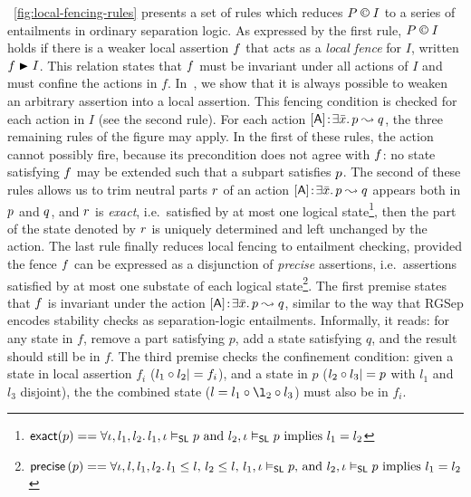 \fig~\ref{fig:local-fencing-rules} presents a set of
rules which reduces  $P \containI I$ to a series of entailments in
ordinary separation logic. As expressed by the first rule,
$P \containI I$ holds if there is a weaker local assertion $\lass{F}$
that acts as a \emph{local fence} for $I$, written 
$\lass{F}\strictfences I$. This relation states that  $\lass{F}$
must be invariant under all actions of $I$ and must confine the
actions in $f$.  In~\cite{colosl-tr14},
we show that it is always possible to weaken an arbitrary assertion into a local assertion. This fencing condition is
checked for each action in $I$ (see the second rule). For each action
$\interAss{[\token{A}]}{\bar x}{\lass{P}}{\lass{Q}}$, the three remaining rules of the figure may
apply. In the first of these rules, the action cannot possibly fire,
because its precondition does not agree with $\lass{F}$: no state
satisfying $\lass{F}$ may be extended such that a subpart satisfies
$\lass{P}$. 
The second of these rules allows us  to trim neutral parts
$\lass{R}$ of an action $\interAss{[\token{A}]}{\bar x}{\lass{P}}{\lass{Q}}$
appears both in $\lass{P}$ and $\lass{Q}$, and $\lass{R}$ is \emph{exact}, i.e.\ satisfied by at most
one logical state\footnote{$\textsf{exact}(p) ==
    \forall \iota, l_1, l_2.\, l_1, \iota \mathrel{\vDash_{\mathsf{SL}}} p\text{ and }l_2, \iota
    \mathrel{\vDash_{\mathsf{SL}}} p\text{ implies } l_1 = l_2$},
then the part of the state denoted by $\lass{R}$ is uniquely
determined and left unchanged by the action. 
The last rule finally reduces local fencing to entailment checking, provided the fence
$\lass{F}$ can be expressed as a disjunction of \emph{precise}
assertions, i.e.\ assertions satisfied by at most one substate of each
logical state\footnote{$\textsf{precise} \left( p \right) ==
    \forall \iota, l, l_1, l_2.\, l_1\leq l\text{, }l_2\leq l\text{, }l_1,
    \iota \mathrel{\vDash_{\mathsf{SL}}} p\text{, and }l_2, \iota \mathrel{\vDash_{\mathsf{SL}}} p
    \text{ implies } l_1 = l_2$}. The
first premise states that $\lass{F}$ is invariant under the action
$\interAss{[\token{A}]}{\bar x}{\lass{P}}{\lass{Q}}$, similar to the way that RGSep encodes
stability checks as separation-logic entailments. Informally, it
reads: for any state in $f$, remove a part satisfying $p$,  add a
state satisfying $q$, and  the result should still be in $f$. The third
premise checks the confinement condition: given a state in local
assertion $f_i$ ($l_1\composeL l_2|= \lass{F}_i$), and 
a state in $p$ ($l_2 \circ   l_3 |= p$ with $l_1$ and $l_3 $
disjoint), the the combined state ($l = l_1 \composeL \l_2 \composeL l_3$)
must also be in $f_i$.

